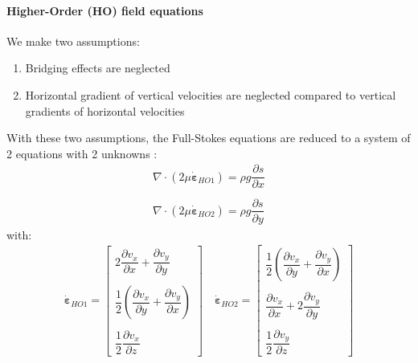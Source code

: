 \paragraph{Higher-Order (HO) field equations}
We make two assumptions:
\begin{enumerate}
	\item Bridging effects are neglected
	\item Horizontal gradient of vertical velocities are neglected compared to vertical gradients of horizontal velocities
\end{enumerate}
With these two assumptions, the Full-Stokes equations are reduced to a system of 2 equations with 2 unknowns \cite{Blatter1995, Pattyn2003}:
\begin{equation}
	\begin{array}{l}
		\nabla\cdot\left(2\mu\dot{\boldsymbol{\varepsilon}}_{HO1}\right) = \rho g \dfrac{\partial s}{\partial x} \\
		\\
		\nabla\cdot\left(2\mu\dot{\boldsymbol{\varepsilon}}_{HO2}\right) = \rho g \dfrac{\partial s}{\partial y}
	\end{array}
\end{equation}
with:
\begin{equation}
	\begin{array}{l}
		\dot{\boldsymbol{\varepsilon}}_{HO1} = \left[
		\begin{array}{c}
			2\dfrac{\partial v_x}{\partial x} +  \dfrac{\partial v_y}{\partial y}\\
			\\
			\dfrac{1}{2}\left(\dfrac{\partial v_x}{\partial y} + \dfrac{\partial v_y}{\partial x}\right)\\
			\\
			\dfrac{1}{2}\dfrac{\partial v_x}{\partial z}
		\end{array}
		\right]
		\quad
		\dot{\boldsymbol{\varepsilon}}_{HO2} =\left[
		\begin{array}{c}
			\dfrac{1}{2}\left(\dfrac{\partial v_x}{\partial y} + \dfrac{\partial v_y}{\partial x}\right)\\
			\\
			\dfrac{\partial v_x}{\partial x} + 2\dfrac{\partial v_y}{\partial y}\\
			\\
			\dfrac{1}{2}\dfrac{\partial v_y}{\partial z}
		\end{array}
		\right]
	\end{array}
\end{equation}

